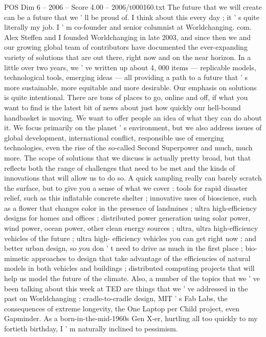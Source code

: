 \begin{textsample}{POS Dim 6 – 2006 – Score 4.00 – 2006/t000160.txt}  \label{ex:f6_pos_010}
The future that we will create can be a future that we ' ll be proud of.
I think about this every day ; it ' s quite literally my job.
I ' m co-founder and senior columnist at Worldchanging. com.
Alex Steffen and I founded Worldchanging in late 2003, and since then we and our growing global team of contributors have documented the ever-expanding variety of solutions that are out there, right now and on the near horizon.
In a little over two years, we ' ve written up about 4, 000 items — replicable models, technological tools, emerging ideas — all providing a path to a future that ' s more sustainable, more equitable and more desirable.
Our emphasis on solutions is quite intentional.
There are tons of places to go, online and off, if what you want to find is the latest bit of news about just how quickly our hell-bound handbasket is moving.
We want to offer people an idea of what they can do about it.
We focus primarily on the planet ' s environment, but we also address issues of global development, international conflict, responsible use of emerging technologies, even the rise of the so-called Second Superpower and much, much more.
The scope of solutions that we discuss is actually pretty broad, but that reflects both the range of challenges that need to be met and the kinds of innovations that will allow us to do so.
A quick sampling really can barely scratch the surface, but to give you a sense of what we cover : tools for rapid disaster relief, such as this inflatable concrete shelter ; innovative uses of bioscience, such as a flower that changes color in the presence of landmines ; ultra high-efficiency designs for homes and offices ; distributed power generation using solar power, wind power, ocean power, other clean energy sources ; ultra, ultra high-efficiency vehicles of the future ; ultra high- efficiency vehicles you can get right now ; and better urban design, so you don ' t need to drive as much in the first place ; bio-mimetic approaches to design that take advantage of the efficiencies of natural models in both vehicles and buildings ; distributed computing projects that will help us model the future of the climate.
Also, a number of the topics that we ' ve been talking about this week at TED are things that we ' ve addressed in the past on Worldchanging : cradle-to-cradle design, MIT ' s Fab Labs, the consequences of extreme longevity, the One Laptop per Child project, even Gapminder.
As a born-in-the-mid-1960s Gen X-er, hurtling all too quickly to my fortieth birthday, I ' m naturally inclined to pessimism.

\end{textsample}
